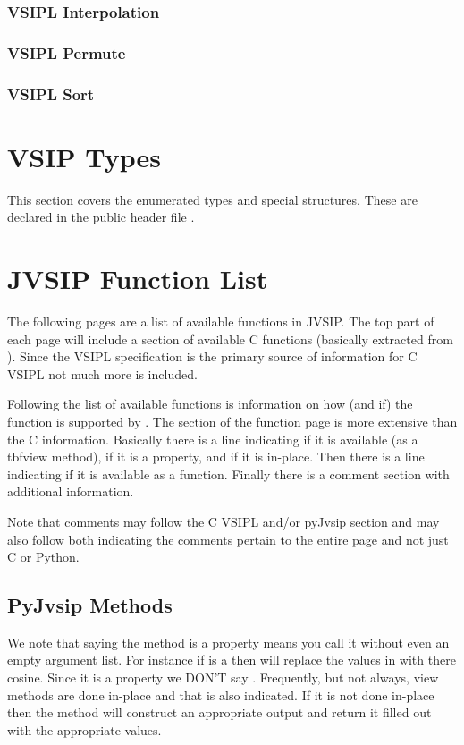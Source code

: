 \subsubsection*{VSIPL Interpolation}
\subsubsection*{VSIPL Permute}
\subsubsection*{VSIPL Sort}
\section*{VSIP Types}
This section covers the enumerated types and special structures. These are declared in the public header file .
 
\section*{JVSIP Function List}
The following pages are a list of available functions in JVSIP. The top part of each page will include a section of available C functions (basically extracted from ). Since the VSIPL specification is the primary source of information for C VSIPL not much more is included. 

Following the list of available functions is information on how (and if) the function is supported by \pyjv. The \pyjv section of the function page is more extensive than the C information. Basically there is a line indicating if it is available (as a 	tbf{view} method), if it is a property, and if it is in-place. Then there is a line indicating if it is available as a \pyjv function. Finally there is a comment section with additional information.

Note that comments may follow the C VSIPL and/or pyJvsip section and may also follow both indicating the comments pertain to the entire page and not just C or Python.

\subsection*{PyJvsip Methods}
We note that saying the method is a property means you call it without even an empty argument list. For instance if  is a \pyjv {} then  will replace the values in  with there cosine. Since it is a property we DON'T say . Frequently, but not always, view methods are done in-place and that is also indicated. If it is not done in-place then the method will construct an appropriate output  and return it filled out with the appropriate values.


